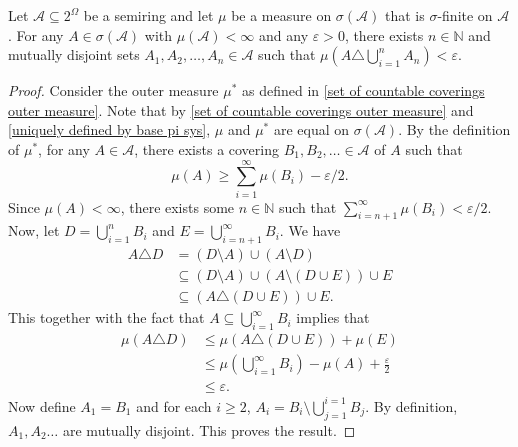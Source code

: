 \begin{theorem}
\label{Approximation Thm for Measures}
    Let $\mathcal{A}\subseteq 2^\Omega$ be a semiring and let $\mu$ be a measure on $\sigma(\mathcal{A})$ that is $\sigma$-finite on $\mathcal{A}$.
    For any $A\in\sigma(\mathcal{A})$ with $\mu(\mathcal{A})<\infty$ and any $\varepsilon>0$, there exists $n\in\mathbb{N}$ and mutually disjoint sets $A_1,A_2,\ldots,A_n\in \mathcal{A}$ such that $\mu\left(A\triangle\bigcup_{i=1}^n A_n\right)<\varepsilon$.
\end{theorem}
\begin{proof}
    Consider the outer measure $\mu^*$ as defined in \ref{set of countable coverings outer measure}. Note that by \ref{set of countable coverings outer measure} and \ref{uniquely defined by base pi sys}, $\mu$ and $\mu^*$ are equal on $\sigma(\mathcal{A})$. By the definition of $\mu^*$, for any $A\in\mathcal{A}$, there exists a covering $B_1,B_2,\ldots\in\mathcal{A}$ of $A$ such that
    $$\mu(A)\geq\sum_{i=1}^\infty\mu(B_i) - \varepsilon/2.$$
    Since $\mu(A)<\infty$, there exists some $n\in\mathbb{N}$ such that $\sum_{i=n+1}^\infty \mu(B_i) < \varepsilon/2$. Now, let $D=\bigcup_{i=1}^n B_i$ and $E=\bigcup_{i=n+1}^\infty B_i$. We have
    \begin{align*}
        A\triangle D &= (D\setminus A)\cup(A\setminus D) \\
        &\subseteq (D\setminus A)\cup (A\setminus (D\cup E))\cup E \\
        &\subseteq (A\triangle (D\cup E))\cup E.
    \end{align*}
    This together with the fact that $A\subseteq\bigcup_{i=1}^\infty B_i$ implies that
    \begin{align*}
        \mu(A\triangle D) &\leq \mu(A\triangle (D\cup E)) + \mu(E) \\
        &\leq  \mu\left(\bigcup_{i=1}^\infty B_i\right) - \mu(A) + \frac{\varepsilon}{2} \\
        &\leq \varepsilon.
    \end{align*}
    Now define $A_1=B_1$ and for each $i\geq 2$, $A_i = B_i\setminus \bigcup_{j=1}^{i=1} B_j$. By definition, $A_1,A_2\ldots$ are mutually disjoint. This proves the result.
    
\end{proof}

